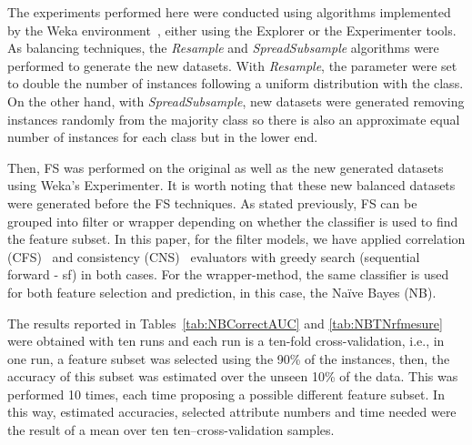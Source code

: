 \documentclass{elsart}
\begin{document}
The experiments performed here were conducted using algorithms implemented by the Weka environment~\cite{WF05}, either using the
Explorer or the Experimenter tools. As balancing techniques, the \emph{Resample} and \emph{SpreadSubsample} algorithms were performed to generate the new datasets. With \emph{Resample}, the parameter were set to double the number of instances following a uniform distribution with the class. On the other hand, with \emph{SpreadSubsample}, new datasets were generated removing
instances randomly from the majority class so there is also an approximate equal number of instances for each class but in the
lower end.

Then, FS was performed on the original as well as the new generated datasets using Weka's Experimenter. It is worth noting that these new balanced datasets were generated before the FS techniques. As stated previously, FS can be grouped into filter or wrapper depending on whether the classifier is used to find the feature subset. In this paper, for the filter models, we have applied correlation (CFS)~\cite{Hall99CFSThesis} and consistency (CNS)~\cite{DLM00} evaluators with greedy search (sequential forward - sf) in both cases. For the wrapper-method, the same classifier is used for both feature selection and prediction, in this case, the Na\"ive Bayes (NB).

The results reported in Tables~\ref{tab:NBCorrectAUC} and \ref{tab:NBTNrfmesure} were obtained with ten runs and each run is a
ten-fold cross-validation, i.e., in one run, a feature subset was selected using the 90\% of the instances, then, the accuracy of this subset was estimated over the unseen 10\% of the data. This was performed 10 times, each time proposing a possible different feature subset. In this way, estimated accuracies, selected attribute numbers and time needed were the result of a mean over ten
ten--cross-validation samples.
\end{document}
